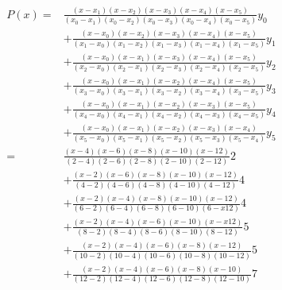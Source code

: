 \documentclass{article}
\begin{document}
            \paragraph{
                \begin{equation*}
                    \begin{split}
                        P(x)=&\frac{(x-x_1)(x-x_2)(x-x_3)(x-x_4)(x-x_5)}{(x_0-x_1)(x_0-x_2)(x_0-x_3)(x_0-x_4)(x_0-x_5)}y_0\\
                            &+\frac{(x-x_0)(x-x_2)(x-x_3)(x-x_4)(x-x_5)}{(x_1-x_0)(x_1-x_2)(x_1-x_3)(x_1-x_4)(x_1-x_5)}y_1\\
                            &+\frac{(x-x_0)(x-x_1)(x-x_3)(x-x_4)(x-x_5)}{(x_2-x_0)(x_2-x_1)(x_2-x_3)(x_2-x_4)(x_2-x_5)}y_2\\
                            &+\frac{(x-x_0)(x-x_1)(x-x_2)(x-x_4)(x-x_5)}{(x_3-x_0)(x_3-x_1)(x_3-x_2)(x_3-x_4)(x_3-x_5)}y_3\\
                            &+\frac{(x-x_0)(x-x_1)(x-x_2)(x-x_3)(x-x_5)}{(x_4-x_0)(x_4-x_1)(x_4-x_2)(x_4-x_3)(x_4-x_5)}y_4\\
                            &+\frac{(x-x_0)(x-x_1)(x-x_2)(x-x_3)(x-x_4)}{(x_5-x_0)(x_5-x_1)(x_5-x_2)(x_5-x_3)(x_5-x_4)}y_5\\
                            =&\frac{(x-4)(x-6)(x-8)(x-10)(x-12)}{(2-4)(2-6)(2-8)(2-10)(2-12)}2\\
                            &+\frac{(x-2)(x-6)(x-8)(x-10)(x-12)}{(4-2)(4-6)(4-8)(4-10)(4-12)}4\\
                            &+\frac{(x-2)(x-4)(x-8)(x-10)(x-12)}{(6-2)(6-4)(6-8)(6-10)(6-x12)}4\\
                            &+\frac{(x-2)(x-4)(x-6)(x-10)(x-x12)}{(8-2)(8-4)(8-6)(8-10)(8-12)}5\\
                            &+\frac{(x-2)(x-4)(x-6)(x-8)(x-12)}{(10-2)(10-4)(10-6)(10-8)(10-12)}5\\
                            &+\frac{(x-2)(x-4)(x-6)(x-8)(x-10)}{(12-2)(12-4)(12-6)(12-8)(12-10)}7\\
                    \end{split}
                \end{equation*}
            }
        \subsection{}
\end{document}
